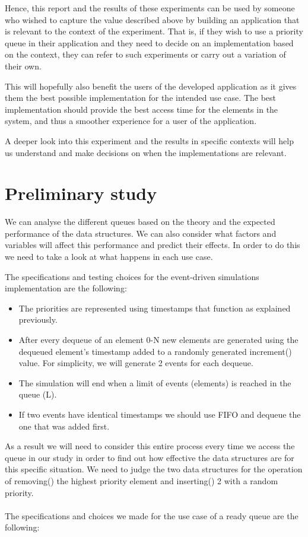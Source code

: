 \documentclass[12pt]{article}
\begin{document}
Hence, this report and the results of these experiments can be used by someone who wished to capture the value described above by building an application that is relevant to the context of the experiment. That is, if they wish to use a priority queue in their application and they need to decide on an implementation based on the context, they can refer to such experiments or carry out a variation of their own. 

This will hopefully also benefit the users of the developed application as it gives them the best possible implementation for the intended use case. The best implementation should provide the best access time for the elements in the system, and thus a smoother experience for a user of the application.

 A deeper look into this experiment and the results in specific contexts will help us understand and make decisions on when the implementations are relevant. 

\section{Preliminary study}

We can analyse the different queues based on the theory and the expected performance of the data structures. We can also consider what factors and variables will affect this performance and predict their effects. In order to do this we need to take a look at what happens in each use case. 

 The specifications and testing choices for the event-driven simulations implementation are the following: 

\begin{itemize}
   \item The priorities are represented using timestamps that function as explained previously. 
   \item After every dequeue of an element 0-N new elements are generated using the dequeued element’s timestamp added to a randomly generated increment() value. For simplicity, we will generate 2 events for each dequeue. 
   \item The simulation will end when a limit of events (elements) is reached in the queue (L).
   \item If two events have identical timestamps we should use FIFO and dequeue the one that was added first. 
\end{itemize}

As a result we will need to consider this entire process every time we access the queue in our study in order to find out how effective the data structures are for this specific situation. We need to judge the two data structures for the operation of removing() the highest priority element and inserting() 2 with a random priority. 
\\
\\
The specifications and choices we made for the use case of a ready queue are the following: 
\end{document}
